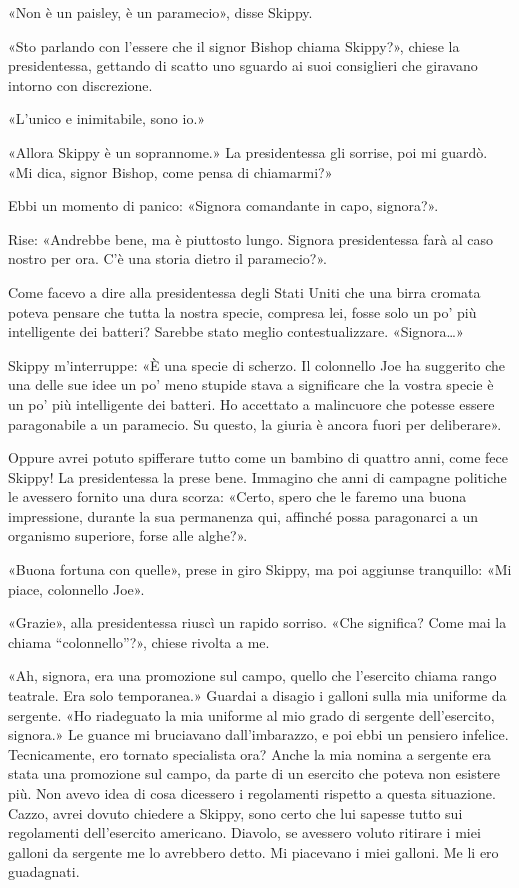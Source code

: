 «Non è un paisley, è un paramecio», disse Skippy.

«Sto parlando con l'essere che il signor Bishop chiama Skippy?», chiese
la presidentessa, gettando di scatto uno sguardo ai suoi consiglieri che
giravano intorno con discrezione.

«L'unico e inimitabile, sono io.»

«Allora Skippy è un soprannome.» La presidentessa gli sorrise, poi mi
guardò. «Mi dica, signor Bishop, come pensa di chiamarmi?»

Ebbi un momento di panico: «Signora comandante in capo, signora?».

Rise: «Andrebbe bene, ma è piuttosto lungo. Signora presidentessa farà
al caso nostro per ora. C'è una storia dietro il paramecio?».

Come facevo a dire alla presidentessa degli Stati Uniti che una birra
cromata poteva pensare che tutta la nostra specie, compresa lei, fosse
solo un po' più intelligente dei batteri? Sarebbe stato meglio
contestualizzare. «Signora\ldots»

Skippy m'interruppe: «È una specie di scherzo. Il colonnello Joe ha
suggerito che una delle sue idee un po' meno stupide stava a significare
che la vostra specie è un po' più intelligente dei batteri. Ho accettato
a malincuore che potesse essere paragonabile a un paramecio. Su questo,
la giuria è ancora fuori per deliberare».

Oppure avrei potuto spifferare tutto come un bambino di quattro anni,
come fece Skippy! La presidentessa la prese bene. Immagino che anni di
campagne politiche le avessero fornito una dura scorza: «Certo, spero
che le faremo una buona impressione, durante la sua permanenza qui,
affinché possa paragonarci a un organismo superiore, forse alle alghe?».

«Buona fortuna con quelle», prese in giro Skippy, ma poi aggiunse
tranquillo: «Mi piace, colonnello Joe».

«Grazie», alla presidentessa riuscì un rapido sorriso. «Che significa?
Come mai la chiama ``colonnello''?», chiese rivolta a me.

«Ah, signora, era una promozione sul campo, quello che l'esercito chiama
rango teatrale. Era solo temporanea.» Guardai a disagio i galloni sulla
mia uniforme da sergente. «Ho riadeguato la mia uniforme al mio grado di
sergente dell'esercito, signora.» Le guance mi bruciavano
dall'imbarazzo, e poi ebbi un pensiero infelice. Tecnicamente, ero
tornato specialista ora? Anche la mia nomina a sergente era stata una
promozione sul campo, da parte di un esercito che poteva non esistere
più. Non avevo idea di cosa dicessero i regolamenti rispetto a questa
situazione. Cazzo, avrei dovuto chiedere a Skippy, sono certo che lui
sapesse tutto sui regolamenti dell'esercito americano. Diavolo, se
avessero voluto ritirare i miei galloni da sergente me lo avrebbero
detto. Mi piacevano i miei galloni. Me li ero guadagnati.

